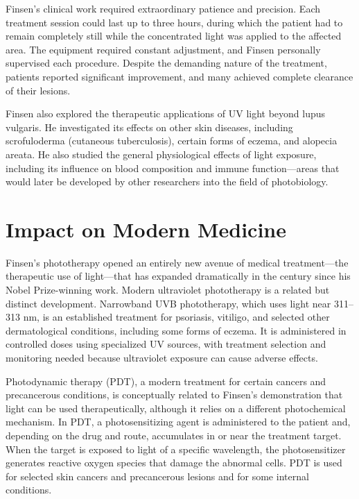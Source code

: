 Finsen's clinical work required extraordinary patience and precision. Each treatment session could last up to three hours, during which the patient had to remain completely still while the concentrated light was applied to the affected area. The equipment required constant adjustment, and Finsen personally supervised each procedure. Despite the demanding nature of the treatment, patients reported significant improvement, and many achieved complete clearance of their lesions.

Finsen also explored the therapeutic applications of UV light beyond lupus vulgaris. He investigated its effects on other skin diseases, including scrofuloderma (cutaneous tuberculosis), certain forms of eczema, and alopecia areata. He also studied the general physiological effects of light exposure, including its influence on blood composition and immune function---areas that would later be developed by other researchers into the field of photobiology.

\section{Impact on Modern Medicine}

Finsen's phototherapy opened an entirely new avenue of medical treatment---the therapeutic use of light---that has expanded dramatically in the century since his Nobel Prize-winning work. Modern ultraviolet phototherapy is a related but distinct development. Narrowband UVB phototherapy, which uses light near 311--313 nm, is an established treatment for psoriasis, vitiligo, and selected other dermatological conditions, including some forms of eczema. It is administered in controlled doses using specialized UV sources, with treatment selection and monitoring needed because ultraviolet exposure can cause adverse effects.

Photodynamic therapy (PDT), a modern treatment for certain cancers and precancerous conditions, is conceptually related to Finsen's demonstration that light can be used therapeutically, although it relies on a different photochemical mechanism. In PDT, a photosensitizing agent is administered to the patient and, depending on the drug and route, accumulates in or near the treatment target. When the target is exposed to light of a specific wavelength, the photosensitizer generates reactive oxygen species that damage the abnormal cells. PDT is used for selected skin cancers and precancerous lesions and for some internal conditions.

